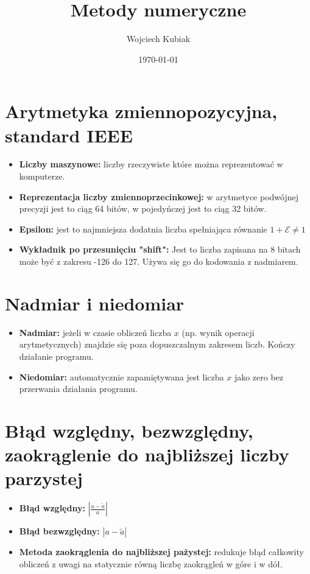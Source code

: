 \documentclass[11pt]{article}
\title{\textbf{Metody numeryczne}}
\author{Wojciech Kubiak}
\date{\today}
\begin{document}
\maketitle

\section{Arytmetyka zmiennopozycyjna, standard IEEE}
\begin{itemize}
    \item \textbf{Liczby maszynowe: }liczby rzeczywiste które można reprezentować w komputerze.
    \item \textbf{Reprezentacja liczby zmiennoprzecinkowej: }w arytmetyce podwójnej precyzji jest to ciąg 64 bitów, w pojedyńczej jest to ciąg 32 bitów.
    \item \textbf{Epsilon: }jest to najmniejsza dodatnia liczba spełniająca równanie $1 + \mathcal{E} \neq 1$
    \item \textbf{Wykładnik po przesunięciu "shift": }Jest to liczba zapisana na 8 bitach może być z zakresu -126 do 127. Używa się go do kodowania z nadmiarem.
\end{itemize}

\section{Nadmiar i niedomiar}
\begin{itemize}
    \item \textbf{Nadmiar: }jeżeli w czasie obliczeń liczba $x$ (np. wynik operacji arytmetycznych) znajdzie się poza dopuszczalnym zakresem liczb. Kończy działanie programu.
    \item \textbf{Niedomiar: }automatycznie zapamiętywana jest liczba $x$ jako zero bez przerwania działania programu.
\end{itemize}

\section{Błąd względny, bezwzględny, zaokrąglenie do najbliższej liczby parzystej}
\begin{itemize}
    \item \textbf{Błąd względny: }\quad $|\frac{a - \tilde{a}}{a}|$
    \item \textbf{Błąd bezwzględny: }\quad $|a-\tilde{a}|$
    \item \textbf{Metoda zaokrąglenia do najbliższej pażystej: }redukuje błąd całkowity obliczeń z uwagi na statycznie równą liczbę zaokrągleń w góre i w dół.
\end{itemize}
\end{document}
